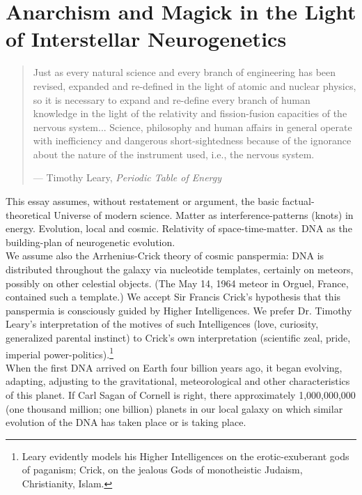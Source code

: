 \chapter[Anarchism and Magick]{Anarchism and Magick in the Light of Interstellar Neurogenetics}

\blockquote{Just as every natural science and every branch of engineering has been revised, expanded and re-defined in the light of atomic and nuclear physics, so it is necessary to expand and re-define every branch of human knowledge in the light of the relativity and fission-fusion capacities of the nervous system... Science, philosophy and human affairs in general operate with inefficiency and dangerous short-sightedness because of the ignorance about the nature of the instrument used, i.e., the nervous system.
\par\begin{flushright} --- Timothy Leary, \emph{Periodic Table of Energy} \end{flushright}
}
This essay assumes, without restatement or argument, the basic factual-theoretical Universe of modern science. Matter as interference-patterns (knots) in energy. Evolution, local and cosmic. Relativity of space-time-matter. DNA as the building-plan of neurogenetic evolution.\\
We assume also the Arrhenius-Crick theory of cosmic panspermia: DNA is distributed throughout the galaxy via nucleotide templates, certainly on meteors, possibly on other celestial objects. (The May 14, 1964 meteor in Orguel, France, contained such a template.) We accept Sir Francis Crick's hypothesis that this panspermia is consciously guided by Higher Intelligences. We prefer Dr. Timothy Leary's interpretation of the motives of such Intelligences (love, curiosity, generalized parental instinct) to Crick's own interpretation (scientific zeal, pride, imperial power-politics).\footnote{Leary evidently models his Higher Intelligences on the erotic-exuberant gods of paganism; Crick, on the jealous Gods of monotheistic Judaism, Christianity, Islam.}\\
When the first DNA arrived on Earth four billion years ago, it began evolving, adapting, adjusting to the gravitational, meteorological and other characteristics of this planet. If Carl Sagan of Cornell is right, there approximately 1,000,000,000 (one thousand million; one billion) planets in our local galaxy on which similar evolution of the DNA has taken place or is taking place.\\
